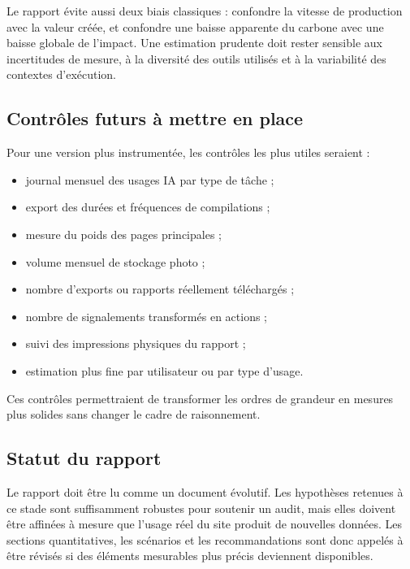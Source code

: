 \documentclass[
  10pt,
  a4paper,
  DIV=11,
  numbers=noendperiod,
  oneside]{scrreprt}
\providecommand{\tightlist}{%
  \setlength{\itemsep}{0pt}\setlength{\parskip}{0pt}}
\begin{document}
Le rapport évite aussi deux biais classiques : confondre la vitesse de
production avec la valeur créée, et confondre une baisse apparente du
carbone avec une baisse globale de l'impact. Une estimation prudente
doit rester sensible aux incertitudes de mesure, à la diversité des
outils utilisés et à la variabilité des contextes d'exécution.

\subsection{Contrôles futurs à mettre en
place}\label{contruxf4les-futurs-uxe0-mettre-en-place}

Pour une version plus instrumentée, les contrôles les plus utiles
seraient :

\begin{itemize}
\tightlist
\item
  journal mensuel des usages IA par type de tâche ;
\item
  export des durées et fréquences de compilations ;
\item
  mesure du poids des pages principales ;
\item
  volume mensuel de stockage photo ;
\item
  nombre d'exports ou rapports réellement téléchargés ;
\item
  nombre de signalements transformés en actions ;
\item
  suivi des impressions physiques du rapport ;
\item
  estimation plus fine par utilisateur ou par type d'usage.
\end{itemize}

Ces contrôles permettraient de transformer les ordres de grandeur en
mesures plus solides sans changer le cadre de raisonnement.

\subsection{Statut du rapport}\label{statut-du-rapport}

Le rapport doit être lu comme un document évolutif. Les hypothèses
retenues à ce stade sont suffisamment robustes pour soutenir un audit,
mais elles doivent être affinées à mesure que l'usage réel du site
produit de nouvelles données. Les sections quantitatives, les scénarios
et les recommandations sont donc appelés à être révisés si des éléments
mesurables plus précis deviennent disponibles.

\newpage{}
\end{document}
